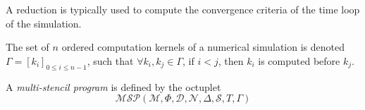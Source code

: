 
A reduction is typically used to compute the convergence criteria of the time loop of the simulation. %


\begin{mydef}
The set of $n$ ordered computation kernels of a numerical simulation is denoted $\Gamma = [k_i]_{0 \leq i \leq n-1}$, such that $\forall k_i,k_j \in \Gamma$, if $i < j$, then $k_i$ is computed before $k_j$.
\end{mydef}

\begin{mydef}
A \textit{multi-stencil program} is defined by the octuplet 
\begin{equation}
\mathcal{MSP}(\mathcal{M},\Phi,\mathcal{D},\mathcal{N},\Delta, \mathcal{S},T,\Gamma)
\label{eq:msp}
\end{equation}
\end{mydef}




